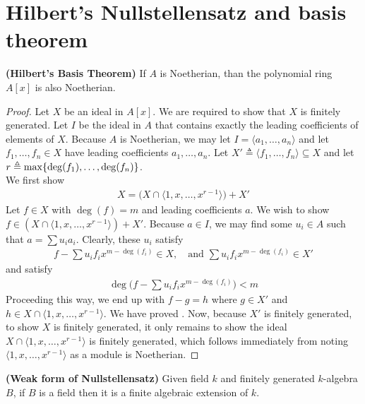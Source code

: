 \documentclass{report}
\begin{document}
\section{Hilbert's Nullstellensatz and basis theorem}
\label{FGN}
\begin{theorem}
\label{HBT}
\textbf{(Hilbert's Basis Theorem)} If $A$ is Noetherian, than the polynomial ring $A[x]$ is also Noetherian. 
\end{theorem}
\begin{proof}
Let $X$ be an ideal in  $A[x]$. We are required to show that $X$ is finitely generated. Let $I$ be the ideal in $A$  that contains exactly the leading coefficients of elements of  $X$. Because $A$ is Noetherian, we may let $I=  \langle a_1,\dots ,a_n\rangle $ and let $f_1,\dots ,f_n \in X$ have leading coefficients $a_1,\dots ,a_n$. Let $X'\triangleq \langle f_1,\dots ,f_n\rangle \subseteq X$ and let $r\triangleq  \max \{ \operatorname{deg}(f_1),\dots ,\operatorname{deg}(f_n) \}$.\\

We first show 
\begin{align}
\label{23X}
X= \Big(X \cap \langle 1,x,\dots ,x^{r-1}\rangle \Big) + X'
\end{align}
Let $f\in X$ with $\operatorname{deg}(f)=m$ and leading coefficients $a$. We wish to show $f \in (X \cap \langle 1,x,\dots ,x^{r-1}\rangle )+X'$. Because $a \in I$, we may find some $u_i \in A$ such that $a= \sum u_i a_i$. Clearly, these $u_i$ satisfy
\begin{align*}
f- \sum u_if_ix^{m-\operatorname{deg}(f_i)} \in X,\quad \text{and }\sum u_i f_ix^{m-\operatorname{deg}(f_i)}\in X'
\end{align*}
and satisfy
\begin{align*}
\operatorname{deg}\Big(f- \sum u_i f_i x^{m-\operatorname{deg}(f_i)}\Big)<m
\end{align*}
Proceeding this way, we end up with $f-g=h$ where  $g\in X'$ and $h \in X \cap \langle 1,x,\dots ,x^{r-1}\rangle $. We have proved . Now, because $X'$ is finitely generated, to show  $X$ is finitely generated, it only remains to show the ideal $X \cap \langle 1,x,\dots ,x^{r-1}\rangle $  is finitely generated, which follows immediately from noting $\langle 1,x,\dots ,x^{r-1}\rangle $ as a module is Noetherian.    
\end{proof}
\begin{theorem}
\label{WfoN}
\textbf{(Weak form of Nullstellensatz)} Given field $k$ and finitely generated  $k$-algebra  $B$, if  $B$ is a field then it is a finite algebraic extension of $k$.  
\end{theorem}
\end{document}
